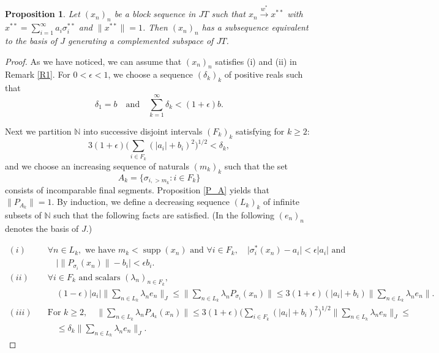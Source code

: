 \documentclass[12pt]{amsart}
\theoremstyle{plain}
\numberwithin{equation}{section}
\newcommand{\N}{\mathbb{N}}
\newcommand{\s}{\sigma}
\DeclareMathOperator{\supp}{supp}
\newtheorem{proposition}[theorem]{Proposition}
\begin{document}
\begin{proposition}\label{P11}
Let $(x_n)_n$ be a block sequence in $JT$ such that
$x_n \xrightarrow{w^*} x^{**}$ with $x^{**} = \sum_{i=1}^\infty a_i \s_i^{**}$ and $\|x^{**}\| = 1$.
Then $(x_n)_n$ has a subsequence equivalent to the basis of $J$ generating a complemented subspace of $JT$.
\end{proposition}
\begin{proof}
As we have noticed, we can assume that $(x_n)_n$ satisfies (i) and (ii) in Remark \ref{R1}. For $0< \epsilon < 1$, we choose a sequence $(\delta_k)_k$ of positive reals such that
\begin{equation}\label{eqn:eq.13}
\delta_1 = b \quad \text{and} \quad \sum_{k=1}^\infty \delta_k < (1 +\epsilon) b.
\end{equation}

Next we partition $\N$ into successive disjoint intervals $(F_k)_k$ satisfying for $k\geq 2$:
\begin{equation}\label{eqn:eq.12}
3(1+\epsilon) \Big(\sum_{i\in F_k}(|a_i| + b_i)^2 \Big)^{1/2} < \delta_k,
\end{equation}
and we choose an increasing sequence of naturals $(m_k)_k$ such that the set
\[ A_k =\Big\{ \s_{i,> m_k} : i \in F_k\Big\} \]
consists of incomparable final segments. Proposition \ref{P_A} yields that $\|P_{A_k}\| = 1$.
By induction, we define a decreasing sequence $(L_k)_k$ of infinite subsets of $\N$ such that the following facts are satisfied. (In the following $(e_n)_n$ denotes the basis of $J$.)

\begin{equation}\label{eqn:eq.11}
\begin{split}
(i) \quad &\forall n\in L_k, \text{ we have } m_k < \supp(x_n) \text{ and } \forall i\in F_k, \quad \Big| \s_i^*(x_n) -a_i \Big| < \epsilon |a_i| \text{ and }  \\
&\quad \Big| \|P_{\s_i}(x_n)\| - b_i \Big| < \epsilon b_i. \\
(ii) \quad &\forall i\in F_k \text{ and scalars }(\lambda_n)_{n\in F_k},\\
&\quad (1-\epsilon) |a_i| \Big\| \sum_{n\in L_k}\lambda_ne_n \Big\|_J\leq \Big\| \sum_{n\in L_k} \lambda_nP_{\s_i}(x_n) \Big\|  \leq  3(1+\epsilon)(|a_i|+ b_i)\Big\| \sum_{n \in L_k} \lambda_ne_n \Big\|. \\
(iii) \quad &\text{For } k\geq 2, \quad \Big\| \sum_{n\in L_k} \lambda_nP_{A_k}(x_n) \Big\| \leq 3(1+\epsilon)\Big(\sum_{i\in F_k}(|a_i|+ b_i)^2\Big)^{1/2}\Big\| \sum_{n \in L_k} \lambda_ne_n \Big\| _J\leq \\ &\quad \leq  \delta_k \Big\| \sum_{n \in L_k} \lambda_ne_n \Big\|_J.
\end{split}
\end{equation}


\end{proof}
\end{document}
